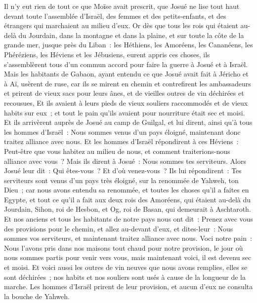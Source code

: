 \begin{multicols}{2}
Il n'y eut rien de tout ce que Moïse avait prescrit, que Josué ne lise tout haut devant toute l'assemblée d'Israël, des femmes et des petits-enfants, et des étrangers qui marchaient au milieu d'eux.
\VerseOne{}Or dès que tous les rois qui étaient au-delà du Jourdain, dans la montagne et dans la plaine, et sur toute la côte de la grande mer, jusque près du Liban~: les Héthiens, les Amoréens, les Cananéens, les Phéréziens, les Héviens et les Jébusiens, eurent appris ces choses,
ils s'assemblèrent tous d'un commun accord pour faire la guerre à Josué et à Israël.
Mais les habitants de Gabaon, ayant entendu ce que Josué avait fait à Jéricho et à Aï,
usèrent de ruse, car ils se mirent en chemin et contrefirent les ambassadeurs et prirent de vieux sacs pour leurs ânes, et de vieilles outres de vin déchirées et recousues,
Et ils avaient à leurs pieds de vieux souliers raccommodés et de vieux habits sur eux~; et tout le pain qu'ils avaient pour nourriture était sec et moisi.
Et ils arrivèrent auprès de Josué au camp de Guilgal, et lui dirent, ainsi qu'à tous les hommes d'Israël~: Nous sommes venus d'un pays éloigné, maintenant donc traitez alliance avec nous.
Et les hommes d'Israël répondirent à ces Héviens~: Peut-être que vous habitez au milieu de nous, et comment traiterions-nous alliance avec vous~?
Mais ils dirent à Josué~: Nous sommes tes serviteurs. Alors Josué leur dit~: Qui êtes-vous~? Et d'où venez-vous~?
Ils lui répondirent~: Tes serviteurs sont venus d'un pays très éloigné, sur la renommée de Yahweh, ton Dieu~; car nous avons entendu sa renommée, et toutes les choses qu'il a faites en Egypte,
et tout ce qu'il a fait aux deux rois des Amoréens, qui étaient au-delà du Jourdain, Sihon, roi de Hesbon, et Og, roi de Basan, qui demeurait à Aschtaroth.
Et nos anciens et tous les habitants de notre pays nous ont dit~: Prenez avec vous des provisions pour le chemin, et allez au-devant d'eux, et dites-leur~: Nous sommes vos serviteurs, et maintenant traitez alliance avec nous.
Voci notre pain~: Nous l'avons pris dans nos maisons tout chaud pour notre provision, le jour où nous sommes partis pour venir vers vous, mais maintenant voici, il est devenu sec et moisi.
Et voici aussi les outres de vin neuves que nous avons remplies, elles se sont déchirées~; nos habits et nos souliers sont usés à cause de la longueur de la marche.
Les hommes d'Israël prirent de leur provision, et aucun d'eux ne consulta la bouche de Yahweh.

\end{multicols}
